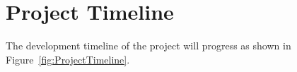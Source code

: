 \documentclass[11pt]{proposalnsf}
\newcommand{\dan}[1]{\textcolor{blue}{{\it [Dan says: #1]}}}
\newlength\q %
\begin{document}
\begin{sloppypar}

























 
\section{Project Timeline}%


The development timeline of the project will progress as shown in Figure~\ref{fig:ProjectTimeline}.%




\end{sloppypar}
\end{document}
